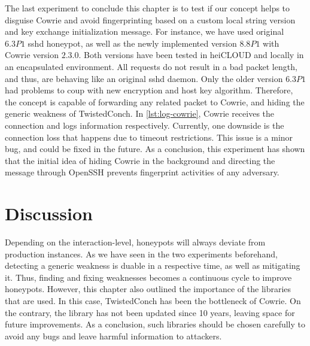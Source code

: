 The last experiment to conclude this chapter is to test if our concept helps to disguise Cowrie and avoid fingerprinting based on a custom local string version and key exchange initialization message.
For instance, we have used \citet{vetterl2020} original $6.3P1$ sshd honeypot, as well as the newly implemented version $8.8P1$ with Cowrie version $2.3.0$.
Both versions have been tested in heiCLOUD and locally in an encapsulated environment.
All requests do not result in a bad packet length, and thus, are behaving like an original sshd daemon.
Only the older version $6.3P1$ had problems to coup with new encryption and  host key algorithm.
Therefore, the concept is capable of forwarding any related packet to Cowrie, and hiding the generic weakness of TwistedConch.
In \autoref{lst:log-cowrie}, Cowrie receives the connection and logs information respectively.
Currently, one downside is the connection loss that happens due to timeout restrictions.
This issue is a minor bug, and could be fixed in the future.
As a conclusion, this experiment has shown that the initial idea of hiding Cowrie in the background and directing the message through OpenSSH prevents fingerprint activities of any adversary.

\begin{figure}
    
\end{figure}

\section{Discussion}

Depending on the interaction-level, honeypots will always deviate from production instances.
As we have seen in the two experiments beforehand, detecting a generic weakness is duable in a respective time, as well as mitigating it.
Thus, finding and fixing weaknesses becomes a continuous cycle to improve honeypots.
However, this chapter also outlined the importance of the libraries that are used.
In this case, TwistedConch has been the bottleneck of Cowrie.
On the contrary, the library has not been updated since 10 years, leaving space for future improvements. 
As a conclusion, such libraries should be chosen carefully to avoid any bugs and leave harmful information to attackers.

